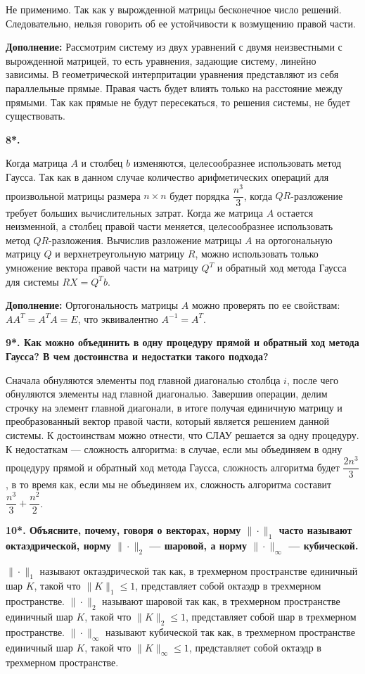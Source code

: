 \documentclass[12pt, a4paper]{article}
\begin{document}
	
	Не применимо. Так как у вырожденной матрицы бесконечное число решений. Следовательно, нельзя говорить об ее устойчивости к возмущению правой части.
	

\textbf{Дополнение:} Рассмотрим систему из двух уравнений с двумя неизвестными с вырожденной матрицей, то есть уравнения, задающие систему, линейно зависимы. В геометрической интерпритации уравнения представляют из себя параллельные прямые. Правая часть будет влиять только на расстояние между прямыми. Так как прямые не будут пересекаться, то решения системы, не будет существовать.

 
	\textbf{8*.  }
	
	Когда матрица $A$ и столбец $b$ изменяются, целесообразнее использовать метод Гаусса. Так как в данном случае количество арифметических операций для произвольной матрицы размера $n \times n $ будет порядка $ \dfrac{n^3}{3} $, когда $QR$-разложение требует больших вычислительных затрат.
	{
		Когда же матрица $A$ остается неизменной, а столбец правой части меняется, целесообразнее использовать метод  $QR$-разложения. Вычислив разложение матрицы $A$ на ортогональную матрицу $Q$ и верхнетреугольную матрицу $R$, можно использовать только умножение вектора правой части на матрицу $Q^T$ и обратный ход метода Гаусса для системы $RX=Q^Tb$.}
	
\textbf{Дополнение:} Ортогональность матрицы $A$ можно проверять по ее свойствам: $AA^T=A^TA=E$, что эквивалентно $A^{-1}=A^T$.
	
	\textbf{ 9*. Как можно объединить в одну процедуру прямой и обратный ход метода Гаусса? В чем достоинства и недостатки такого подхода? }
	
	Сначала обнуляются элементы под главной диагональю столбца $i$, после чего обнуляются элементы над главной диагональю. Завершив операции, делим строчку на элемент главной диагонали, в итоге получая единичную матрицу и преобразованный вектор правой части, который является решением данной системы.
	К достоинствам можно отнести, что СЛАУ решается за одну процедуру. К недостаткам --- сложность алгоритма: в случае, если мы объединяем в одну процедуру прямой и обратный ход метода Гаусса, сложность алгоритма будет $ \dfrac{2 n^3}{3} $, в то время как, если мы не объединяем их, сложность алгоритма составит $ \dfrac{ n^3}{3} + \dfrac{n^2}{2} $.
	
	
	\textbf{10*. Объясните, почему, говоря о векторах, норму $ \| \cdot \| _1$ часто называют октаэдрической, норму $ \| \cdot \|_2$ — шаровой, а норму $ \| \cdot \|_{\infty}$ — кубической. }
	
	
	$ \| \cdot \| _1$ называют октаэдрической так как, в трехмерном пространстве единичный шар $K$, такой что $ \| K \| _1 \leq  1$, представляет собой октаэдр в трехмерном пространстве. 
	$ \| \cdot \| _2$ называют шаровой так как, в трехмерном пространстве единичный шар $K$, такой что $ \| K \| _2 \leq 1$, представляет собой шар в трехмерном пространстве. 
	$ \| \cdot \|_{\infty}$ называют кубической так как, в трехмерном пространстве единичный шар $K$, такой что $ \| K \| _{\infty} \leq 1$, представляет собой октаэдр в трехмерном пространстве. 
	
	\newpage
	
\end{document}
